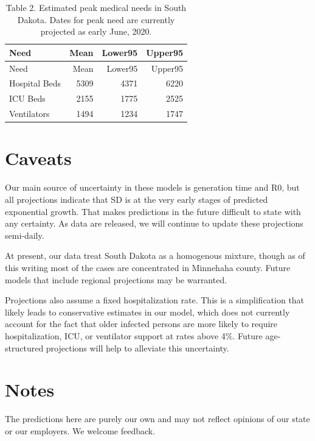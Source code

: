 \documentclass[
]{article}
\begin{document}
\begin{longtable}[]{@{}lrrr@{}}
\caption{Table 2. Estimated peak medical needs in South Dakota. Dates
for peak need are currently projected as early June,
2020.}\tabularnewline
\toprule
Need & Mean & Lower95 & Upper95\tabularnewline
\midrule
\endfirsthead
\toprule
Need & Mean & Lower95 & Upper95\tabularnewline
\midrule
\endhead
Hospital Beds & 5309 & 4371 & 6220\tabularnewline
ICU Beds & 2155 & 1775 & 2525\tabularnewline
Ventilators & 1494 & 1234 & 1747\tabularnewline
\bottomrule
\end{longtable}

\hypertarget{caveats}{%
\section{Caveats}\label{caveats}}

Our main source of uncertainty in these models is generation time and
R0, but all projections indicate that SD is at the very early stages of
predicted exponential growth. That makes predictions in the future
difficult to state with any certainty. As data are released, we will
continue to update these projections semi-daily.

At present, our data treat South Dakota as a homogenous mixture, though
as of this writing most of the cases are concentrated in Minnehaha
county. Future models that include regional projections may be
warranted.

Projections also assume a fixed hospitalization rate. This is a
simplification that likely leads to conservative estimates in our model,
which does not currently account for the fact that older infected
persons are more likely to require hospitalization, ICU, or ventilator
support at rates above 4\%. Future age-structured projections will help
to alleviate this uncertainty.

\hypertarget{notes}{%
\section{Notes}\label{notes}}

The predictions here are purely our own and may not reflect opinions of
our state or our employers. We welcome feedback.
\end{document}
